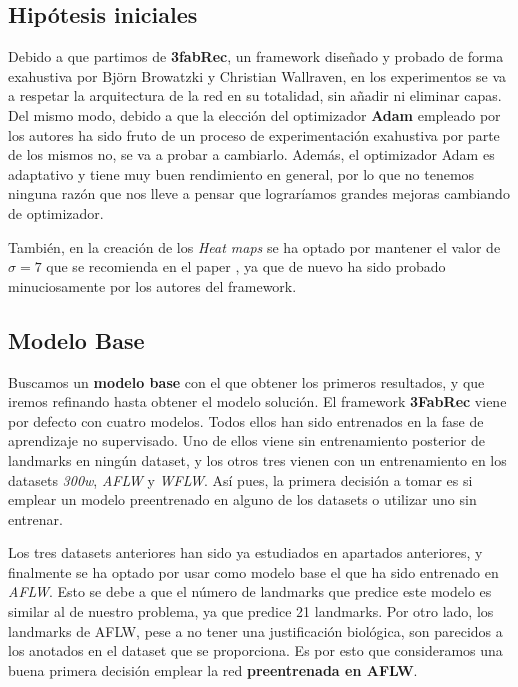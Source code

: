     \subsection{Hipótesis iniciales}
        \noindent Debido a que partimos de \textbf{3fabRec}, un framework diseñado y probado de forma exahustiva por Björn Browatzki y Christian Wallraven, en los experimentos se va a respetar la arquitectura de la red en su totalidad, sin añadir ni eliminar capas. Del mismo modo, debido a que la elección del optimizador \textbf{Adam} empleado por los autores ha sido fruto de un proceso de experimentación exahustiva por parte de los mismos no, se va a probar a cambiarlo. Además, el optimizador Adam es adaptativo y tiene muy buen rendimiento en general, por lo que no tenemos ninguna razón que nos lleve a pensar que lograríamos grandes mejoras cambiando de optimizador.

        \medskip

        \noindent También, en la creación de los \textit{Heat maps} se ha optado por mantener el valor de $\sigma =7$ que se recomienda en el paper \cite{browatzki20203fabrec}, ya que de nuevo ha sido probado minuciosamente por los autores del framework.
    
    \subsection{Modelo Base}
        \noindent Buscamos un \textbf{modelo base} con el que obtener los primeros resultados, y que iremos refinando hasta obtener el modelo solución. El framework \textbf{3FabRec} viene por defecto con cuatro modelos. Todos ellos han sido entrenados en la fase de aprendizaje no supervisado. Uno de ellos viene sin entrenamiento posterior de landmarks en ningún dataset, y los otros tres vienen con un entrenamiento en los datasets \textit{300w}, \textit{AFLW} y \textit{WFLW}. Así pues, la primera decisión a tomar es si emplear un modelo preentrenado en alguno de los datasets o utilizar uno sin entrenar. 

        \medskip

        \noindent Los tres datasets anteriores han sido ya estudiados en apartados anteriores, y finalmente se ha optado por usar como modelo base el que ha sido entrenado en \textit{AFLW}. Esto se debe a que el número de landmarks que predice este modelo es similar al de nuestro problema, ya que predice 21 landmarks. Por otro lado, los landmarks de AFLW, pese a no tener una justificación biológica, son parecidos a los anotados en el dataset que se proporciona. Es por esto que consideramos una buena primera decisión emplear la red \textbf{preentrenada en AFLW}.

